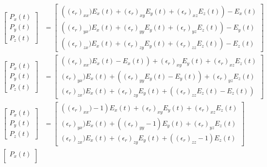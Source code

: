 \begin{itemize}
\begin{align*}
      \begin{bmatrix}
        P_x(t) \\
        P_y(t) \\
        P_z(t)
      \end{bmatrix}
      &=
      \begin{bmatrix}
        \left((\epsilon_r)_{xx})E_x(t) + (\epsilon_r)_{xy}E_y(t) + (\epsilon_r)_{xz}E_z(t)\right) - E_x(t) \\
        \left((\epsilon_r)_{yx})E_x(t) + (\epsilon_r)_{yy}E_y(t) + (\epsilon_r)_{yz}E_z(t)\right) - E_y(t) \\
        \left((\epsilon_r)_{zx})E_x(t) + (\epsilon_r)_{zy}E_y(t) + (\epsilon_r)_{zz}E_z(t)\right) - E_z(t)
      \end{bmatrix} \\
      \begin{bmatrix}
        P_x(t) \\
        P_y(t) \\
        P_z(t)
      \end{bmatrix}
      &=
      \begin{bmatrix}
        \left((\epsilon_r)_{xx})E_x(t) - E_x(t)\right) + (\epsilon_r)_{xy}E_y(t) + (\epsilon_r)_{xz}E_z(t) \\
        (\epsilon_r)_{yx})E_x(t) + \left((\epsilon_r)_{yy}E_y(t) - E_y(t)\right) + (\epsilon_r)_{yz}E_z(t) \\
        (\epsilon_r)_{zx})E_x(t) + (\epsilon_r)_{zy}E_y(t) + \left((\epsilon_r)_{zz}E_z(t) - E_z(t)\right)
      \end{bmatrix} \\
      \begin{bmatrix}
        P_x(t) \\
        P_y(t) \\
        P_z(t)
      \end{bmatrix}
      &=
      \begin{bmatrix}
        \left((\epsilon_r)_{xx}) - 1\right)E_x(t) + (\epsilon_r)_{xy}E_y(t) + (\epsilon_r)_{xz}E_z(t) \\
        (\epsilon_r)_{yx})E_x(t) + \left((\epsilon_r)_{yy} - 1 \right)E_y(t) + (\epsilon_r)_{yz}E_z(t) \\
        (\epsilon_r)_{zx})E_x(t) + (\epsilon_r)_{zy}E_y(t) + \left((\epsilon_r)_{zz} - 1\right)E_z(t)
      \end{bmatrix} \\
      \begin{bmatrix}
        P_x(t) \\

\end{bmatrix}
\end{align*}
\end{itemize}

